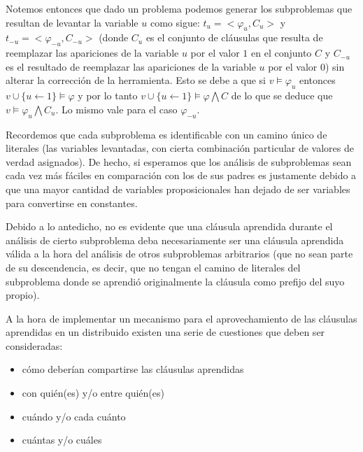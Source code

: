 Notemos entonces que dado un problema \nonemptytask podemos generar los
subproblemas que resultan de levantar la variable $u$ como sigue:
$t_u=<\varphi_u, C_u>$ y $t_{-u}=<\varphi_{-u}, C_{-u}>$ (donde $C_u$ es el
conjunto de cláusulas que resulta de reemplazar las apariciones de la variable
$u$ por el valor $1$ en el conjunto $C$ y $C_{-u}$ es el resultado de
reemplazar las apariciones de la variable $u$ por el valor $0$) sin alterar la
corrección de la herramienta. Esto se debe a que si $v \models \varphi_u$
entonces $v\cup\{u\leftarrow1\} \models \varphi$ y por lo tanto
$v\cup\{u\leftarrow1\} \models \varphi \bigwedge C$ de lo que se deduce que $v
\models \varphi_u \bigwedge C_u$. Lo mismo vale para el caso $\varphi_{-u}$.

Recordemos que cada subproblema es identificable con un camino
único de literales (las variables levantadas, con cierta combinación
particular de valores de verdad asignados). De hecho, si esperamos que los
análisis de subproblemas sean cada vez más fáciles en comparación con los de
sus padres es justamente debido a que una mayor cantidad de variables
proposicionales han dejado de ser variables para convertirse en constantes.

Debido a lo antedicho, no es evidente que una cláusula aprendida durante el
análisis de cierto subproblema deba necesariamente ser una cláusula aprendida
válida a la hora del análisis de otros subproblemas arbitrarios (que no sean
parte de su descendencia, es decir, que no tengan el camino de literales del
subproblema donde se aprendió originalmente la cláusula como prefijo del suyo
propio).

A la hora de implementar un mecanismo para el aprovechamiento de las cláusulas
aprendidas en un \ssolver distribuido existen una serie de cuestiones que
deben ser consideradas:


\begin{itemize}
\item cómo deberían compartirse las cláusulas aprendidas
\item con quién(es) y/o entre quién(es)
\item cuándo y/o cada cuánto
\item cuántas y/o cuáles
\end{itemize}

